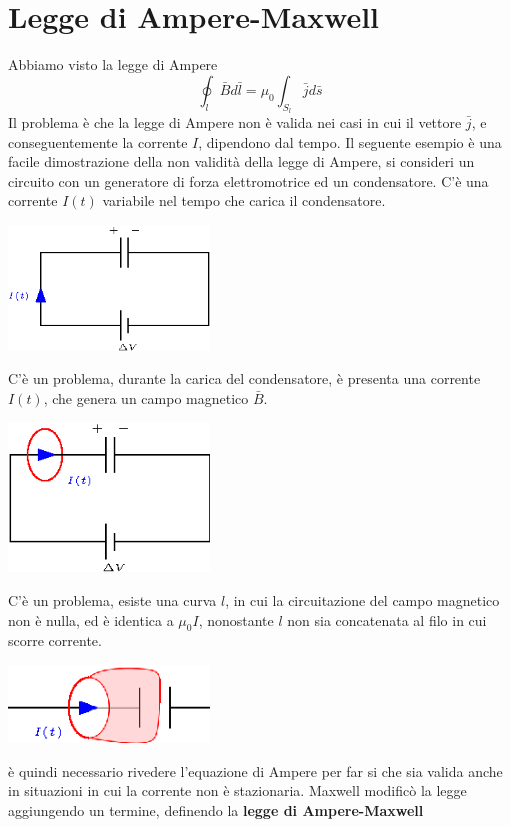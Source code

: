 \documentclass[10pt, letterpaper]{report}
\begin{document}
\section{Legge di Ampere-Maxwell}
Abbiamo visto la legge di Ampere  
$$ \oint_l \bar B d\bar l = \mu_0\int_{S_l}\bar j d\bar s$$
Il problema è che la legge di Ampere non è valida nei casi in cui il vettore $\bar j$, e conseguentemente la corrente $I$, dipendono dal tempo. \acc 
Il seguente esempio è una facile dimostrazione della non validità della legge di Ampere, si consideri un circuito con un generatore di forza elettromotrice ed un condensatore. C'è una corrente $I(t)$ variabile nel tempo che carica il condensatore.
\begin{center}
    \includegraphics[width=0.4\textwidth]{images/ampereMax1.eps}
\end{center}
C'è un problema, durante la carica del condensatore, è presenta una corrente $I(t)$, che genera un campo magnetico $\bar B$.
\begin{center}
    \includegraphics[width=0.4\textwidth]{images/ampereMax2.eps}
\end{center}
C'è un problema, esiste una curva $l$, in cui la circuitazione del campo magnetico non è nulla, ed è identica a $\mu_0I$, nonostante $l$ non sia concatenata al filo in cui scorre corrente.\begin{center}
    \includegraphics[width=0.4\textwidth]{images/ampereMax3.eps}
\end{center}
è quindi necessario rivedere l'equazione di Ampere per far si  che sia valida anche in situazioni in cui la corrente non è stazionaria. Maxwell modificò la legge aggiungendo un termine, definendo la \textbf{legge di Ampere-Maxwell}
\end{document}
